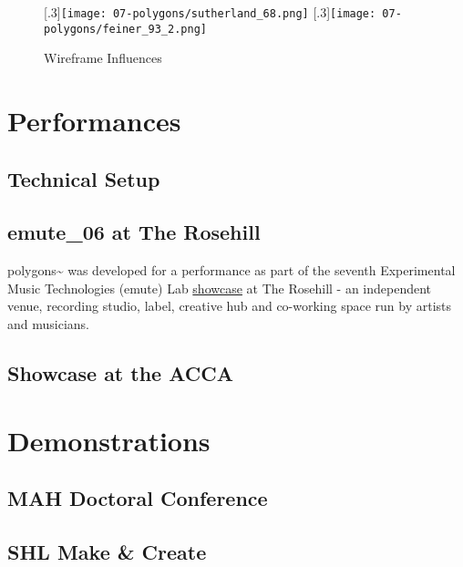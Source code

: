 \begin{figure}
    \centering
    [.3\linewidth]{\texttt{[image: 07-polygons/sutherland\_68.png]}}
    \hfill
    [.3\linewidth]{\texttt{[image: 07-polygons/feiner\_93\_2.png]}}%
    \caption{Wireframe Influences}
    \label{fig: polygons-wireframes}
\end{figure}


\section{Performances} \label{sec: polygons-performances}
\subsection{Technical Setup} \label{sec: polygons-performances-setup}

\subsection{emute\_06 at The Rosehill} \label{sec: polygons-performances-rosehill}
polygons\textasciitilde{} was developed for a performance as part of the seventh Experimental Music Technologies (emute) Lab \href{http://www.emutelab.org/blog/emutelab6}{showcase} at The Rosehill - an independent venue, recording studio, label, creative hub and co-working space run by artists and musicians.

\subsection{Showcase at the ACCA} \label{sec: polygons-performances-acca}



\section{Demonstrations} \label{sec: polygons-demonstrations}
\subsection{MAH Doctoral Conference} \label{sec: polygons-demonstrations-mah}

\subsection{SHL Make \& Create} \label{sec: polygons-demonstrations-shl}

